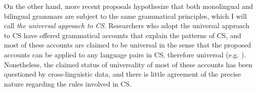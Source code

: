 On the other hand, more recent proposals hypothesize that both monolingual and bilingual grammars are subject to the same grammatical principles, which I will call \textit{the universal approach to \ac{CS}}. Researchers who adopt the universal approach to \ac{CS} have offered grammatical accounts that explain the patterns of \ac{CS}, and most of these accounts are claimed to be universal in the sense that the proposed accounts can be applied to any language pairs in \ac{CS}, therefore universal (e.g. \citealt{Belazietal1994,Chan2003,Chan2008,GonzalezLopez2011,GonzalezLopez2012,Lopez2020,MacSwan1999,Mahootian1996,Shim2013,Shim2016,Woolford1983}). Nonetheless, the claimed status of universality of most of these accounts has been questioned by cross-linguistic data, and there is little agreement of the precise nature regarding the rules involved in \ac{CS}. 

